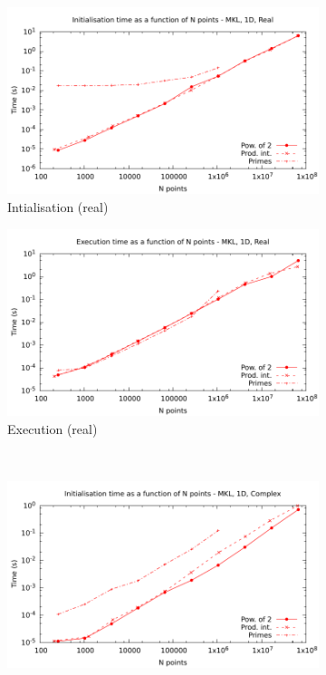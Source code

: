 \documentclass[12pt, a4paper]{article}
\begin{document}
\begin{figure}[H]
\captionsetup{width=0.8\linewidth}
\centering
\begin{subfigure}{.5\textwidth}
\centering
\includegraphics[width=.9\linewidth]{graphs/1d-mkl-init-r.pdf}
\caption{Intialisation (real)}
\label{1DMKLRI}
\end{subfigure}%
\begin{subfigure}{.5\textwidth}
\centering
\includegraphics[width=.9\linewidth]{graphs/1d-mkl-exec-r.pdf}
\caption{Execution (real)}
\label{1DMKLR}
\end{subfigure}\\
\begin{subfigure}{.5\textwidth}
\centering
\includegraphics[width=.9\linewidth]{graphs/1d-mkl-init-c.pdf}

\end{subfigure}
\end{figure}
\end{document}
